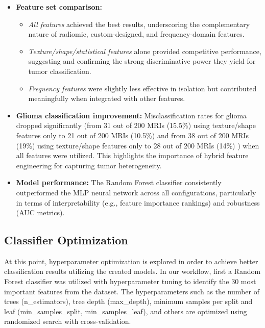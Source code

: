 \documentclass[11pt,a4paper]{article}
\begin{document}
\begin{itemize}
    \item \textbf{Feature set comparison:}

    \begin{itemize}
        \item \textit{All features} achieved the best results, underscoring the complementary nature of radiomic, custom-designed, 
		and frequency-domain features.
        \item \textit{Texture/shape/statistical features} alone provided competitive performance, 
		suggesting and confirming the strong discriminative power they yield for tumor classification.
        \item \textit{Frequency features} were slightly less effective in isolation 
		but contributed meaningfully when integrated with other features.
    \end{itemize}
    
    \item \textbf{Glioma classification improvement:}
	    Misclassification rates for glioma dropped significantly (from 31 out of 200 MRIs (15.5\%) using texture/shape features 
		only to 21 out of 200 MRIs (10.5\%)  and from 38 out of 200 MRIs (19\%) using texture/shape features 
		only to 28 out of 200 MRIs (14\%)  )
		when all features were utilized. This highlights the importance of hybrid feature engineering for capturing tumor heterogeneity.
    
    \item \textbf{Model performance:}
		The Random Forest classifier consistently outperformed the MLP neural network across all configurations, 
		particularly in terms of interpretability (e.g., feature importance rankings) and robustness (AUC metrics).
\end{itemize}




		\subsection{Classifier Optimization}

		At this point, hyperparameter optimization is explored in order to achieve better classification
		results utilizing the created models.
		In our workflow,  first a Random Forest classifier was utilized with hyperparameter tuning 
		to identify the 30 most important features from the dataset. 
		The hyperparameters such as the number of trees (n\_estimators), tree depth (max\_depth), 
		minimum samples per split and leaf (min\_samples\_split, min\_samples\_leaf), 
		and others are optimized using randomized search with cross-validation. 
		
\end{document}
